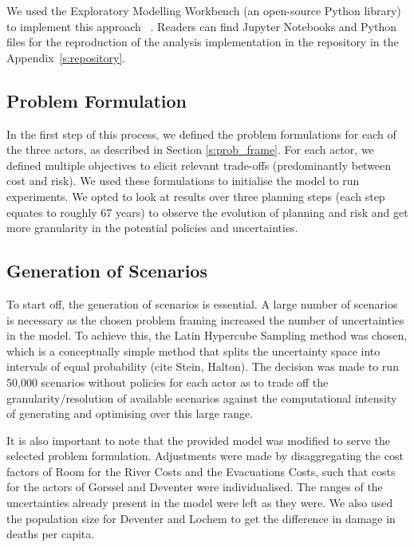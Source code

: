 We used the Exploratory Modelling Workbench (an open-source Python library) to implement this approach ~\parencite{kwakkel_exploratory_2017}. Readers can find Jupyter Notebooks and Python files for the reproduction of the analysis implementation in the repository in the Appendix~\ref{s:repository}.

\subsection{Problem Formulation}
In the first step of this process, we defined the problem formulations for each of the three actors, as described in Section \ref{s:prob_frame}. For each actor, we defined multiple objectives to elicit relevant trade-offs (predominantly between cost and risk). We used these formulations to initialise the model to run experiments. We opted to look at results over three planning steps (each step equates to roughly 67 years) to observe the evolution of planning and risk and get more granularity in the potential policies and uncertainties.

\subsection{Generation of Scenarios}
To start off, the generation of scenarios is essential. A large number of scenarios is necessary as the chosen problem framing increased the number of uncertainties in the model. To achieve this, the Latin Hypercube Sampling method was chosen, which is a conceptually simple method that splits the uncertainty space into intervals of equal probability (cite Stein, Halton). The decision was made to run 50,000 scenarios without policies for each actor as to trade off the granularity/resolution of available scenarios against the computational intensity of generating and optimising over this large range.  

It is also important to note that the provided model was modified to serve the selected problem formulation. Adjustments were made by disaggregating the cost factors of Room for the River Costs and the Evacuations Costs, such that costs for the actors of Gorssel and Deventer were individualised. The ranges of the uncertainties already present in the model were left as they were. We also used the population size for Deventer and Lochem to get the difference in damage in deaths per capita. 


